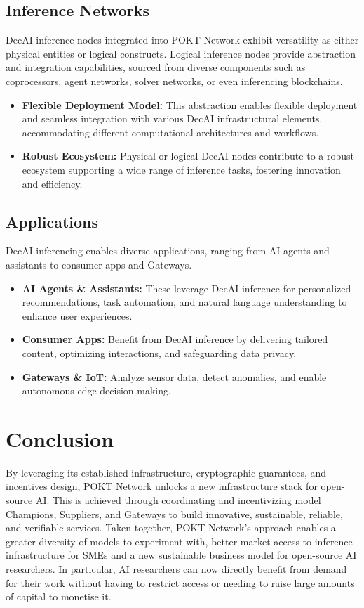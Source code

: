 \documentclass[conference,compsoc]{IEEEtran}
\begin{document}
\subsection{Inference Networks}
DecAI inference nodes integrated into POKT Network exhibit versatility as either physical entities or logical constructs. Logical inference nodes provide abstraction and integration capabilities, sourced from diverse components such as coprocessors, agent networks, solver networks, or even inferencing blockchains.

\begin{itemize}
    \item \textbf{Flexible Deployment Model:} This abstraction enables flexible deployment and seamless integration with various DecAI infrastructural elements, accommodating different computational architectures and workflows.

    \item \textbf{Robust Ecosystem:} Physical or logical DecAI nodes contribute to a robust ecosystem supporting a wide range of inference tasks, fostering innovation and efficiency.

\end{itemize}

\subsection{Applications}
DecAI inferencing enables diverse applications, ranging from AI agents and assistants to consumer apps and Gateways.
\begin{itemize}
    \item \textbf{AI Agents \& Assistants:} These leverage DecAI inference for personalized recommendations, task automation, and natural language understanding to enhance user experiences.

    \item \textbf{Consumer Apps:} Benefit from DecAI inference by delivering tailored content, optimizing interactions, and safeguarding data privacy.

    \item \textbf{Gateways \& IoT:} Analyze sensor data, detect anomalies, and enable autonomous edge decision-making.
\end{itemize}

\section{Conclusion}
By leveraging its established infrastructure, cryptographic guarantees, and incentives design, POKT Network unlocks a new infrastructure stack for open-source AI. This is achieved through coordinating and incentivizing model Champions, Suppliers, and Gateways to build innovative, sustainable, reliable, and verifiable services. Taken together, POKT Network’s approach enables a greater diversity of models to experiment with, better market access to inference infrastructure for SMEs and a new sustainable business model for open-source AI researchers. In particular, AI researchers can now directly benefit from demand for their work without having to restrict access or needing to raise large amounts of capital to monetise it.
\end{document}

